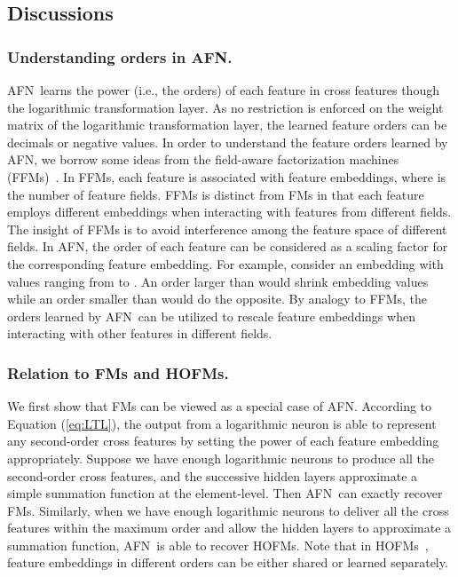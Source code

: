 \documentclass[letterpaper]{article} \usepackage{aaai20}  \usepackage{times}  \usepackage{helvet} \usepackage{courier}  \usepackage[hyphens]{url}  \usepackage{graphicx} \urlstyle{rm} \def\UrlFont{\rm}  \usepackage{graphicx}  \frenchspacing  \setlength{\pdfpagewidth}{8.5in}  \setlength{\pdfpageheight}{11in}
\newcommand{\model}{{AFN}~}
\newcommand{\modelns}{{AFN}}
\begin{document}
\subsection{Discussions}

\subsubsection{Understanding orders in \modelns.}
\model learns the power (i.e., the orders) of each feature in cross features though the logarithmic transformation layer. As no restriction is enforced on the weight matrix  of the logarithmic transformation layer, the learned feature orders can be decimals or negative values.
In order to understand the feature orders learned by \modelns, we borrow some ideas from the field-aware factorization machines (FFMs)~\cite{FFM}. In FFMs, each feature is associated with  feature embeddings, where  is the number of feature fields. FFMs is distinct from FMs in that each feature employs different embeddings when interacting with features from different fields. The insight of FFMs is to avoid interference among the feature space of different fields. 
In \modelns, the order of each feature can be considered as a scaling factor for the corresponding feature embedding. For example, consider an embedding with values ranging from  to . An order larger than  would shrink embedding values while an order smaller than  would do the opposite. By analogy to FFMs, the orders learned by \model can be utilized to rescale feature embeddings when interacting with other features in different fields.

\subsubsection{Relation to FMs and HOFMs.}
We first show that FMs can be viewed as a special case of \modelns.
According to Equation (\ref{eq:LTL}), the output  from a logarithmic neuron is able to represent any second-order cross features by setting the power  of each feature embedding appropriately.
Suppose we have enough logarithmic neurons to produce all the second-order cross features, and the successive hidden layers approximate a simple summation function at the element-level. Then \model can exactly recover FMs.
Similarly, when we have enough logarithmic neurons to deliver all the cross features within the maximum order and allow the hidden layers to approximate a summation function, \model is able to recover HOFMs. Note that in HOFMs~\cite{hofm}, feature embeddings in different orders can be either shared or learned separately. 
\end{document}
